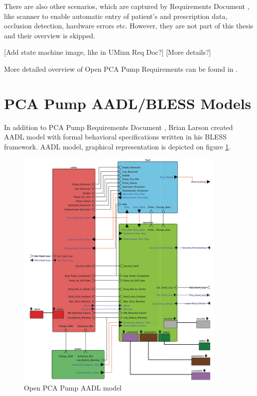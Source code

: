 There are also other scenarios, which are captured by Requirements Document \cite{PcaReq}, like scanner to enable automatic entry of patient's and prescription data, occlusion detection, hardware errors etc. However, they are not part of this thesis and their overview is skipped.


[Add state machine image, like in UMinn Req Doc?]
[More details?]


More detailed overview of Open PCA Pump Requirements can be found in \cite{OpenSourcePCAPump:Paper}.


\section{PCA Pump AADL/BLESS Models}
\label{pcapump:aadl-bless-models}

In addition to PCA Pump Requirements Document \cite{PcaReq}, Brian Larson created AADL model with formal behavioral specifications written in his BLESS framework. AADL model, graphical representation is depicted on figure \ref{figure:pca-pump-aadl-model}. 

\begin{figure}%
    \begin{center}
      \includegraphics[width=0.9\textwidth]{figures/pca-pump-aadl-model.png}      
    \end{center}
    \caption{Open PCA Pump AADL model}
    \label{figure:pca-pump-aadl-model}
\end{figure}

